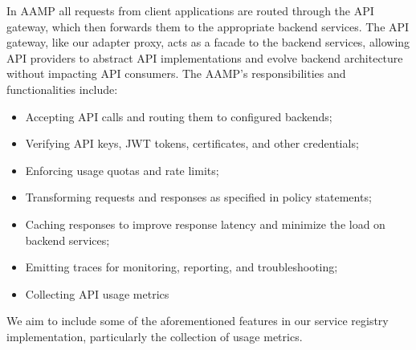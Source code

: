 In AAMP all requests from client applications are routed through the API gateway, which then forwards them to the appropriate backend services.
The API gateway, like our adapter proxy, acts as a facade to the backend services,
allowing API providers to abstract API implementations and evolve backend architecture without impacting API consumers.
The AAMP's responsibilities and functionalities include:

\begin{itemize}
    \item Accepting API calls and routing them to configured backends;
    \item Verifying API keys, JWT tokens, certificates, and other credentials;
    \item Enforcing usage quotas and rate limits;
    \item Transforming requests and responses as specified in policy statements;
    \item Caching responses to improve response latency and minimize the load on backend services;
    \item Emitting traces for monitoring, reporting, and troubleshooting;
    \item Collecting API usage metrics
\end{itemize}


We aim to include some of the aforementioned features in our service registry implementation, particularly the collection of usage metrics.
